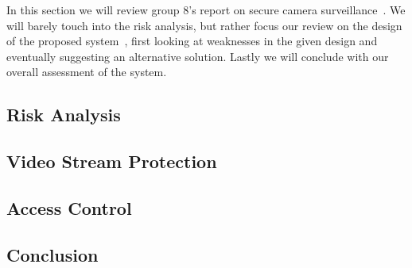 
In this section we will review group 8's report on secure camera
surveillance~\cite{8}. We will barely touch into the risk analysis,
but rather focus our review on the design of the proposed
system~\cite[sec. 3]{8}, first looking at weaknesses in the given
design and eventually suggesting an alternative solution. Lastly we
will conclude with our overall assessment of the system.

\subsection{Risk Analysis}
\label{sec:8-risk}


\subsection{Video Stream Protection}
\label{sec:8-enc}


\subsection{Access Control}
\label{sec:8-secret}


\subsection{Conclusion}
\label{sec:8-conc}

